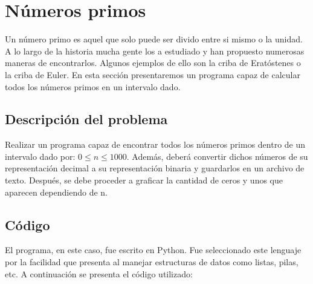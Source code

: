 \documentclass[12pt]{article}
\begin{document}
\section{Números primos}
Un número primo es aquel que solo puede ser divido entre si mismo o la unidad. A lo largo de la historia mucha gente los a estudiado y han propuesto numerosas maneras de encontrarlos. Algunos ejemplos de ello son la criba de Eratóstenes o la criba de Euler. En esta sección presentaremos un programa capaz de calcular todos los números primos en un intervalo dado.

\subsection{Descripción del problema}
Realizar un programa capaz de encontrar todos los números primos dentro de un intervalo dado por: $0 \leq n \leq 1000$. Además, deberá convertir dichos números de su representación decimal a su representación binaria y guardarlos en un archivo de texto. Después, se debe proceder a graficar la cantidad de ceros y unos que aparecen dependiendo de n.

\subsection{Código}
El programa, en este caso, fue escrito en Python. Fue seleccionado este lenguaje por la facilidad que presenta al manejar estructuras de datos como listas, pilas, etc. A continuación se presenta el código utilizado:\\
\end{document}
